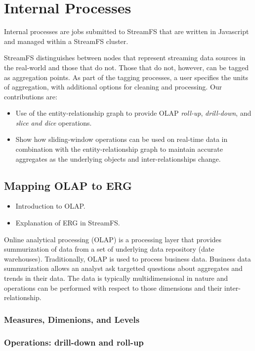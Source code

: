 \section{Internal Processes}
Internal processes are jobs submitted to StreamFS that are written in Javascript and managed within a StreamFS cluster.

StreamFS distinguishes between nodes that represent streaming data sources in the real-world
and those that do not.  Those that do not, however, can be tagged as aggregation points.  As part of the 
tagging processes, a user specifies the units of aggregation, with additional options for cleaning
and processing.  Our contributions are:  

\begin{itemize}
\item Use of the entity-relationship graph to provide OLAP \emph{roll-up}, \emph{drill-down},
		and \emph{slice and dice} operations.
\item Show how sliding-window operations can be used on real-time data in combination with the entity-relationship
		graph to maintain accurate aggregates as the underlying objects and inter-relationships change.
\end{itemize}


\subsection{Mapping OLAP to ERG}

\begin{itemize}
\item Introduction to OLAP.
\item Explanation of ERG in StreamFS.
\end{itemize}
Online analytical processing (OLAP) is a processing layer that provides summurization of data
from a set of underlying data repository (date warehouses).  Traditionally, OLAP is used to process
business data.  Business data summurization allows an analyst ask targetted questions about aggregates 
and trends in their data.  The data is typically multidimensional in nature and operations can be performed with
respect to those dimensions and their inter-relationship.

\subsubsection{Measures, Dimenions, and Levels}

\subsubsection{Operations: drill-down and roll-up}

